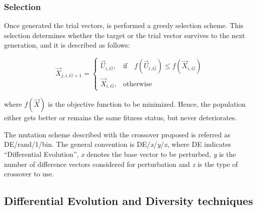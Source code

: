 \subsubsection{Selection}
Once generated the trial vectors, is performed a greedy selection scheme.
%
This selection determines whether the target or the trial vector survives to the next generation, and it is described as follows:

\begin{equation} \label{eqn:selection}
\vec{X}_{j,i,G+1}= 
\begin{cases}
    \vec{U}_{i,G},& \text{if} \quad f(\vec{U}_{i,G}) \leq f(\vec{X}_{i,G})  \\
    \vec{X}_{i,G},              & \text{otherwise}
\end{cases}
\end{equation}

where $f(\vec{X})$ is the objective function to be minimized.
%
Hence, the population either gets better or remains the same fitness status, but never deteriorates.

The mutation scheme described with the crossover proposed is referred as DE/rand/1/bin.
%
The general convention is DE/\textit{x}/\textit{y}/\textit{x}, where DE indicates ``Differential Evolution'', \textit{x} denotes the base vector to be perturbed, \textit{y} is the number of difference vectors considered for perturbation and \textit{z} is the type of crossover to use.

\subsection{Differential Evolution and Diversity techniques}

